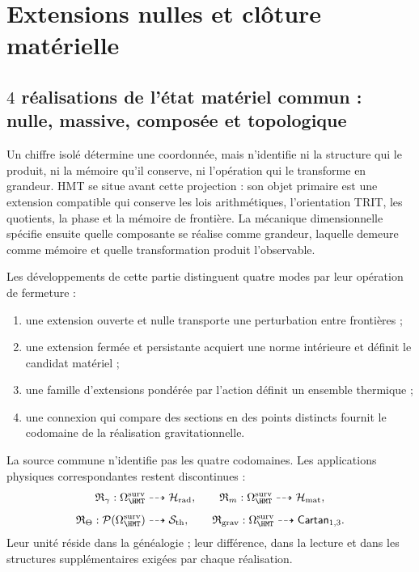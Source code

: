 \chapter{Extensions nulles et clôture matérielle}
\label{chap:realizaciones-nula-material}

\section{\(4\) réalisations de l'état matériel commun : nulle, massive, composée et topologique}
\label{sec:cuatro-modos-realizacion}

Un chiffre isolé détermine une coordonnée, mais n'identifie ni la structure
qui le produit, ni la mémoire qu'il conserve, ni l'opération qui le transforme en
grandeur. HMT se situe avant cette projection : son objet primaire est une
extension compatible qui conserve les lois arithmétiques, l'orientation
TRIT, les quotients, la phase et la mémoire de frontière. La mécanique dimensionnelle
spécifie ensuite quelle composante se réalise comme grandeur, laquelle demeure
comme mémoire et quelle transformation produit l'observable.

Les développements de cette partie distinguent quatre modes par leur opération de
fermeture :
\begin{enumerate}
 \item une extension ouverte et nulle transporte une perturbation entre
 frontières ;
 \item une extension fermée et persistante acquiert une norme intérieure et définit
 le candidat matériel ;
 \item une famille d'extensions pondérée par l'action définit un ensemble
 thermique ;
 \item une connexion qui compare des sections en des points distincts fournit le
 codomaine de la réalisation gravitationnelle.
\end{enumerate}
La source commune n'identifie pas les quatre codomaines. Les applications physiques
correspondantes restent discontinues :
\[
 \mathfrak R_\gamma:
 \Omega_{\HMT}^{\rm surv}\dashrightarrow\mathcal H_{\rm rad},
 \qquad
 \mathfrak R_m:
 \Omega_{\HMT}^{\rm surv}\dashrightarrow\mathcal H_{\rm mat},
\]
\[
 \mathfrak R_\Theta:
 \mathcal P(\Omega_{\HMT}^{\rm surv})\dashrightarrow\mathcal S_{\rm th},
 \qquad
 \mathfrak R_{\rm grav}:
 \Omega_{\HMT}^{\rm surv}\dashrightarrow\mathsf{Cartan}_{1,3}.
\]
Leur unité réside dans la généalogie ; leur différence, dans la lecture et dans les
structures supplémentaires exigées par chaque réalisation.

